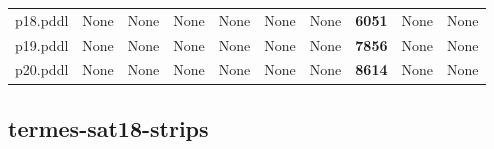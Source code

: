 \documentclass{article}
\begin{document}
\begin{tabular}{@{}lrrrrrrrrr@{}}
p18.pddl & \multicolumn{1}{|l|}{None} & \multicolumn{1}{|l|}{None} & \multicolumn{1}{|l|}{None} & \multicolumn{1}{|l|}{None} & \multicolumn{1}{|l|}{None} & \multicolumn{1}{|l|}{None} & \textbf{6051} & \multicolumn{1}{|l|}{None} & \multicolumn{1}{|l|}{None} \\
p19.pddl & \multicolumn{1}{|l|}{None} & \multicolumn{1}{|l|}{None} & \multicolumn{1}{|l|}{None} & \multicolumn{1}{|l|}{None} & \multicolumn{1}{|l|}{None} & \multicolumn{1}{|l|}{None} & \textbf{7856} & \multicolumn{1}{|l|}{None} & \multicolumn{1}{|l|}{None} \\
p20.pddl & \multicolumn{1}{|l|}{None} & \multicolumn{1}{|l|}{None} & \multicolumn{1}{|l|}{None} & \multicolumn{1}{|l|}{None} & \multicolumn{1}{|l|}{None} & \multicolumn{1}{|l|}{None} & \textbf{8614} & \multicolumn{1}{|l|}{None} & \multicolumn{1}{|l|}{None} \\
\end{tabular}

\hypertarget{restrictions-termes-sat18-strips}{}
\subsection*{termes-sat18-strips}
\end{document}
